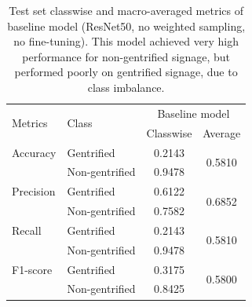 \begin{table}[h]
\begin{tabular}{llcc}
\multirow{2}{*}{Metrics}   & \multirow{2}{*}{Class} & \multicolumn{2}{c}{Baseline model}        \\ \cline{3-4} 
                           &                        & Classwise & Average                 \\ \hline
Accuracy                   & Gentrified             & 0.2143    & \multirow{2}{*}{0.5810} \\
                           & Non-gentrified         & 0.9478    &                         \\
Precision                  & Gentrified             & 0.6122    & \multirow{2}{*}{0.6852} \\
                           & Non-gentrified         & 0.7582    &                         \\
Recall                     & Gentrified             & 0.2143    & \multirow{2}{*}{0.5810} \\
                           & Non-gentrified         & 0.9478    &                         \\
F1-score                   & Gentrified             & 0.3175    & \multirow{2}{*}{0.5800} \\
                           & Non-gentrified         & 0.8425    &                        
\end{tabular}
\caption{Test set classwise and macro-averaged metrics of baseline model (ResNet50, no weighted sampling, no fine-tuning). This model achieved very high performance for non-gentrified signage, but performed poorly on gentrified signage, due to class imbalance.}
\label{fig:baseline_metrics}
\end{table}


